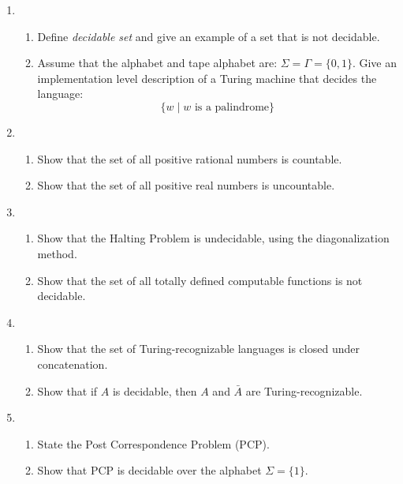 \documentclass[11pt]{article}
\begin{document}
\begin{enumerate}
\item
\begin{enumerate}
	\item Define {\em decidable set} and give an example of a set
		that is not decidable.
	\item Assume that the alphabet and tape alphabet are: $\Sigma = \Gamma = \{0,1\}$.
		Give an implementation level description of a Turing machine that
		decides the language: 
		$$
			\{w\mid \mbox{$w$ is a palindrome}\}
		$$

\end{enumerate}

\item 
\begin{enumerate}
	\item Show that the set of all positive rational numbers is countable.
	\item Show that the set of all positive real numbers is uncountable.
	
\end{enumerate}
\item 
\begin{enumerate}
	\item Show that the Halting Problem is undecidable, using the diagonalization method.
	\item Show that the set of all totally defined computable functions is not decidable.
	
\end{enumerate}
\item
\begin{enumerate}
	\item Show that the set of Turing-recognizable languages is closed under concatenation.
	\item Show that if $A$ is decidable, then $A$ and $\bar{A}$ are Turing-recognizable.
	
\end{enumerate} 
\item 
\begin{enumerate}
	\item State the Post Correspondence Problem (PCP).
	\item Show that PCP is decidable over the alphabet $\Sigma = \{1\}$.
\end{enumerate}


\end{enumerate}
\end{document}
